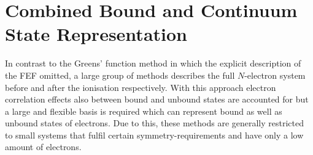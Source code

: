 {%
%
\section{Combined Bound and Continuum State Representation}
\label{ch:r-mat}
In contrast to the Greens' function method in which the explicit description of the FEF  omitted, a large group of methods describes the full $N$-electron system before and after the ionisation respectively.
With this approach electron correlation effects also between bound and unbound states are accounted for but a large and flexible basis is required which can represent bound as well as unbound states of electrons.
Due to this, these methods are generally restricted to small systems that fulfil certain symmetry-requirements and have only a low amount of electrons.

}
